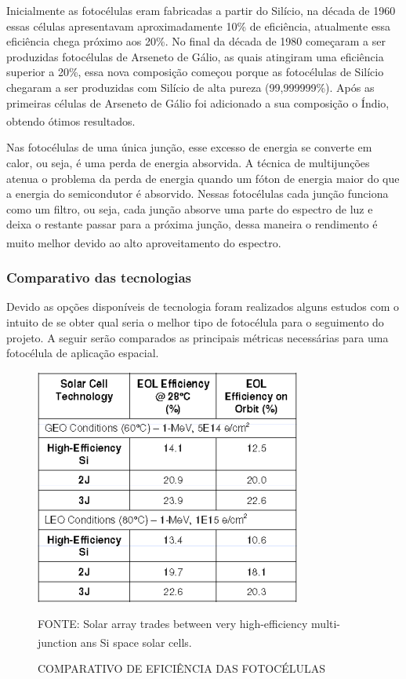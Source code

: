 \documentclass[
	12pt,				%
	openright,			%
	oneside,			%
	a4paper,			%
	english,			%
	french,				%
	spanish,			%
	brazil,				%
	oldfontcommands
	]{abntex2}
\begin{document}
	Inicialmente as fotocélulas eram fabricadas a partir do Silício, na década de 1960 essas células apresentavam aproximadamente 10\% de eficiência, atualmente essa eficiência chega próximo aos 20\%. No final da década de 1980 começaram a ser produzidas fotocélulas de Arseneto de Gálio, as quais atingiram uma eficiência superior a 20\%, essa nova composição começou porque as fotocélulas de Silício chegaram a ser produzidas com Silício de alta pureza (99,999999\%). Após as primeiras células de Arseneto de Gálio foi adicionado a sua composição o Índio, obtendo ótimos resultados.\textsuperscript{\cite{Fatemi}}
	
	Nas fotocélulas de uma única junção, esse excesso de energia se converte em calor, ou seja, é uma perda de energia absorvida. A técnica de multijunções atenua o problema da perda de energia quando um fóton de energia maior do que a energia do semicondutor é absorvido. Nessas fotocélulas cada junção funciona como um filtro, ou seja, cada junção absorve uma parte do espectro de luz e deixa o restante passar para a próxima junção, dessa maneira o rendimento é muito melhor devido ao alto aproveitamento do espectro.\textsuperscript{\cite{Fatemi}}
	
\subsubsection[Comparativo das tecnologias]{Comparativo das tecnologias}

	Devido as opções disponíveis de tecnologia foram realizados alguns estudos com o intuito de se obter qual seria o melhor tipo de fotocélula para o seguimento do projeto. A seguir serão comparados as principais métricas necessárias para uma fotocélula de aplicação espacial.
	
	\begin{figure}[th]
		\caption{COMPARATIVO DE EFICIÊNCIA DAS FOTOCÉLULAS}
		\label{Fig_cell_comp1}
		\centering
		\includegraphics[width=0.6\linewidth]{./figs/cell_comp1}
			
		\begin{small}
			FONTE: Solar array trades between very high-efficiency multi-junction ans Si space solar cells.\textsuperscript{\cite{Fatemi}}
		\end{small}		
	\end{figure}
	
\end{document}
